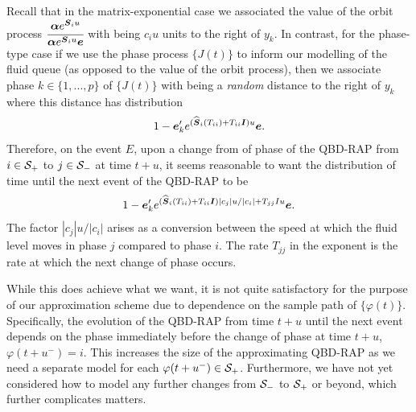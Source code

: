 Recall that in the matrix-exponential case we associated the value of the orbit process \(\cfrac{\boldsymbol\alpha e^{\boldsymbol S_iu} }{\boldsymbol\alpha e^{\boldsymbol S_iu } \boldsymbol e}\) with being \(c_iu\) units to the right of \(y_{k}\). In contrast, for the phase-type case if we use the phase process \(\{J(t)\}\) to inform our modelling of the fluid queue (as opposed to the value of the orbit process), then we associate phase \(k\in\{1,...,p\}\) of \(\{J(t)\}\) with being a \emph{random} distance to the right of \(y_k\) where this distance has distribution 
\begin{align}
	1-\boldsymbol e_k' e^{(\widehat{\boldsymbol S}_i(T_{ii}) + T_{ii}\boldsymbol I)u} \boldsymbol e.\label{eqn: skgj2}
\end{align}
Therefore, on the event \(E\), upon a change from of phase of the QBD-RAP from \(i\in\mathcal{S}_+\) to \(j\in\mathcal{S}_-\) at time \(t+u\), it seems reasonable to want the distribution of time until the next event of the QBD-RAP to be
\begin{align}
	1-\boldsymbol e_k' e^{(\widehat{\boldsymbol S}_i(T_{ii}) + T_{ii}\boldsymbol I)|c_j|u/|c_i| + T_{jj}Iu} \boldsymbol e.\label{eqn: skgj3}
\end{align}
The factor \(|c_j|u/|c_i|\) arises as a conversion between the speed at which the fluid level moves in phase \(j\) compared to phase \(i\). The rate \(T_{jj}\) in the exponent is the rate at which the next change of phase occurs. 

While this does achieve what we want, it is not quite satisfactory for the purpose of our approximation scheme due to dependence on the sample path of \(\{\varphi(t)\}\). Specifically, the evolution of the QBD-RAP from time \(t+u\) until the next event depends on the phase immediately before the change of phase at time \(t+u\), \(\varphi(t+u^-)=i\). This increases the size of the approximating QBD-RAP as we need a separate model for each \(\varphi(t+u^-)\in\mathcal{S}_+\). Furthermore, we have not yet considered how to model any further changes from \(\mathcal{S}_-\) to \(\mathcal{S}_+\) or beyond, which further complicates matters. 

